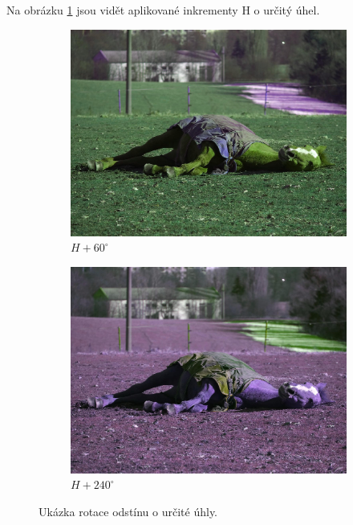 \documentclass[11pt, a4paper, titlepage]{article}
\begin{document}
Na obrázku \ref{fig:huerotate-res} jsou vidět aplikované inkrementy H o určitý úhel.
\begin{figure}[h]
    \centering
    \begin{subfigure}[t]{0.4\textwidth}
        \vskip 0pt
        \includegraphics[width=1.0\textwidth]{horse_hue_60.jpg}
        \caption{$H + 60^\circ$}
    \end{subfigure}
    \hspace{1cm}
    \begin{subfigure}[t]{0.4\textwidth}
        \vskip 0pt
        \includegraphics[width=1.0\textwidth]{horse_hue_240.jpg}
        \caption{$H + 240^\circ$}
    \end{subfigure}
    \caption{Ukázka rotace odstínu o určité úhly.}
    \label{fig:huerotate-res}
\end{figure}
\end{document}
